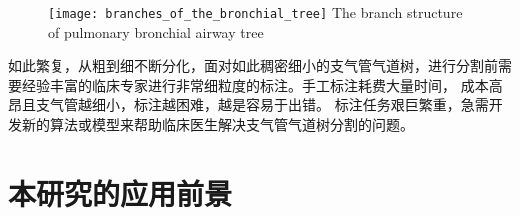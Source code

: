 \begin{figure}[!htp]
	\centering
	\texttt{[image: branches\_of\_the\_bronchial\_tree]}
		{The branch structure of pulmonary bronchial airway tree}
	\label{fig:branches_of_bronchial_tree}	
\end{figure}

如此繁复，从粗到细不断分化，面对如此稠密细小的支气管气道树，进行分割前需要经验丰富的临床专家进行非常细粒度的标注。手工标注耗费大量时间，
成本高昂且支气管越细小，标注越困难，越是容易于出错。 标注任务艰巨繁重，急需开发新的算法或模型来帮助临床医生解决支气管气道树分割的问题。

\section{本研究的应用前景}\label{sec:application_prospect}

